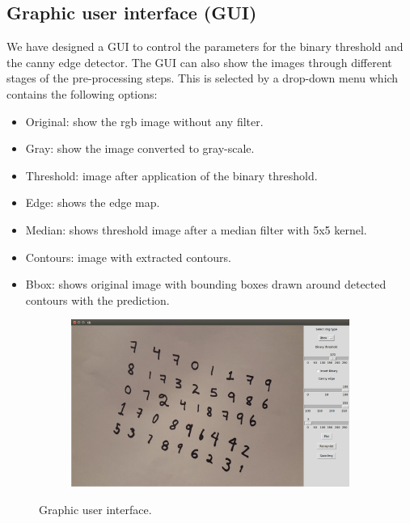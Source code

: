 \documentclass[12pt, letterpaper]{article}
\begin{document}
\subsection{Graphic user interface (GUI)}
	We have designed a GUI to control the parameters for the binary threshold and the canny edge detector. The GUI can also show the images through different stages of the pre-processing steps. This is selected by a drop-down menu which contains the following options:
	\begin{itemize}
		\item Original: show the rgb image without any filter.
		\item Gray: show the image converted to gray-scale.
		\item Threshold: image after application of the binary threshold.
		\item Edge: shows the edge map.
		\item Median: shows threshold image after a median filter with 5x5 kernel.
		\item Contours: image with extracted contours.
		\item Bbox: shows original image with bounding boxes drawn around detected contours with the prediction.
	\end{itemize}
	
\begin{figure}[!h]
	\begin{center}	
	\begin{subfigure}{0.9\textwidth}
	\centering
	\includegraphics*[width=1 \textwidth]{tk_015.png}
	\end{subfigure}
		
	\end{center}
	\caption{ Graphic user interface.}
	\label{fig:gui}
\end{figure}  
\end{document}
